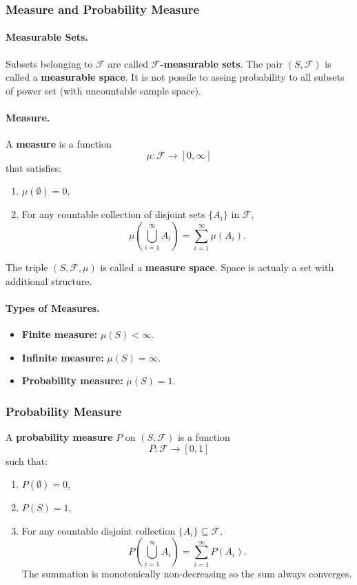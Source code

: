 \subsubsection{Measure and Probability Measure}

\paragraph{Measurable Sets.}
Subsets belonging to $\mathcal{F}$ are called \textbf{$\mathcal{F}$-measurable sets}.  
The pair $(S, \mathcal{F})$ is called a \textbf{measurable space}. It is not possile to assing probability to all subsets of power set (with uncountable sample space).

\paragraph{Measure.}
A \textbf{measure} is a function
\[
\mu: \mathcal{F} \to [0, \infty]
\]
that satisfies:
\begin{enumerate}
    \item $\mu(\emptyset) = 0$,
    \item For any countable collection of disjoint sets $\{A_i\}$ in $\mathcal{F}$,
    \[
    \mu\left(\bigcup_{i=1}^\infty A_i\right) = \sum_{i=1}^\infty \mu(A_i).
    \]
\end{enumerate}

The triple $(S, \mathcal{F}, \mu)$ is called a \textbf{measure space}. Space is actualy a set with additional structure.

\paragraph{Types of Measures.}
\begin{itemize}
    \item \textbf{Finite measure:} $\mu(S) < \infty$.
    \item \textbf{Infinite measure:} $\mu(S) = \infty$.
    \item \textbf{Probability measure:} $\mu(S) = 1$.
\end{itemize}


\subsubsection{Probability Measure}

A \textbf{probability measure} $P$ on $(S, \mathcal{F})$ is a function
\[
P: \mathcal{F} \to [0, 1]
\]
such that:
\begin{enumerate}
    \item $P(\emptyset) = 0$,
    \item $P(S) = 1$,
    \item For any countable disjoint collection $\{A_i\} \subseteq \mathcal{F}$,
    \[
    P\left(\bigcup_{i=1}^\infty A_i\right) = \sum_{i=1}^\infty P(A_i).
    \] The summation is monotonically non-decreasing so the sum always converges.
\end{enumerate}


